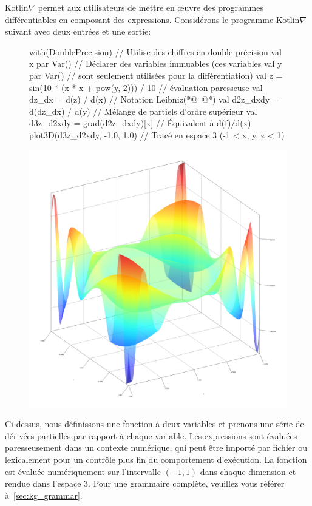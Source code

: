 Kotlin$\nabla$ permet aux utilisateurs de mettre en œuvre des programmes différentiables en composant des expressions. Considérons le programme Kotlin$\nabla$ suivant avec deux entrées et une sortie:
%
\begin{figure}[H] \label{fig:basic_kotlingrad}
\begin{unbreakablekotlin}
with(DoublePrecision) { // Utilise des chiffres en double précision
  val x par Var() // Déclarer des variables immuables (ces variables
  val y par Var() // sont seulement utilisées pour la différentiation)
  val z = sin(10 * (x * x + pow(y, 2))) / 10 // évaluation paresseuse
  val dz_dx = d(z) / d(x) // Notation Leibniz(*@~\citep{christianson2012leibniz}@*)
  val d2z_dxdy = d(dz_dx) / d(y) // Mélange de partiels d'ordre supérieur
  val d3z_d2xdy = grad(d2z_dxdy)[x] // Équivalent à d(f)/d(x)
  plot3D(d3z_d2xdy, -1.0, 1.0) // Tracé en espace 3 (-1 < x, y, z < 1)
}
\end{unbreakablekotlin}
\includegraphics[scale=0.43]{../figures/plot_result.png}
\end{figure}
%
Ci-dessus, nous définissons une fonction à deux variables et prenons une série de dérivées partielles par rapport à chaque variable. Les expressions sont évaluées paresseusement dans un contexte numérique, qui peut être importé par fichier ou lexicalement pour un contrôle plus fin du comportement d'exécution. La fonction est évaluée numériquement sur l'intervalle $(-1, 1)$ dans chaque dimension et rendue dans l'espace 3. Pour une grammaire complète, veuillez vous référer à~\autoref{sec:kg_grammar}.
